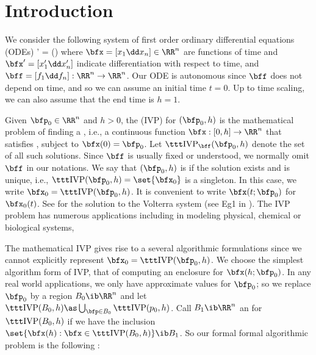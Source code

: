 \section{Introduction}
	We consider the following system of
	first order ordinary differential equations (ODEs)
		\bfx' = \bff(\bfx)
	\eeql
	where $\bfx=[x_1\dd x_n]\in\RR^n$
	are functions of time and $\bfx'=[x_1'\dd x_n']$
	indicate differentiation with respect to time,
	and $\bff=[f_1\dd f_n]:\RR^n\to\RR^n$.
	Our ODE is autonomous since $\bff$ does not
	depend on time, and so we can assume an initial time
	$t=0$.  Up to time scaling, we can also assume that the end time
	is $h=1$.  

	Given $\bfp_0\in\RR^n$ and $h>0$,
	the  (IVP) for $(\bfp_0,h)$ is the
	mathematical problem of finding a ,
	i.e.,
	a continuous function $\bfx: [0,h]\to\RR^n$
	that satisfies , 
	subject to $\bfx(0)=\bfp_0$.
	Let $\ivp_\bff(\bfp_0,h)$ denote the set of all such solutions.
    Since $\bff$ is usually fixed or understood,
	we normally omit $\bff$ in our notations.
	We say that $(\bfp_0,h)$ is  if
	the solution exists and is unique, i.e.,
	$\ivp(\bfp_0,h)=\set{\bfx_0}$ is a singleton. 
	In this case, we write $\bfx_0= \ivp(\bfp_0,h)$.
	It is convenient to write
			$\bfx(t;\bfp_0)$ for $\bfx_0(t)$.
	See  for the solution to the
	Volterra system (see Eg1 in ).
	The IVP problem has numerous applications including
	in modeling physical, chemical or biological systems,
    





	The mathematical IVP gives rise to a several
	algorithmic formulations since we cannot explicitly represent
	$\bfx_0= \ivp(\bfp_0,h)$.
	We choose the simplest algorithm form of IVP,
	that of computing an enclosure for $\bfx(h;\bfp_0)$.
	In any real world applications, we only have 
	approximate values for $\bfp_0$; so we replace $\bfp_0$ by a
    region $B_0\ib\RR^n$ and let
    $\ivp(B_0,h)\as \bigcup_{\bfp\in B_0}\ivp(p_0,h)$.  
	Call $B_1\ib \RR^n$ an  for $\ivp(B_0,h)$
	if we have the inclusion
		$\set{\bfx(h) : \bfx\in \ivp(B_0,h)}\ib B_1$.
	So our formal formal algorithmic problem is
	the following :

